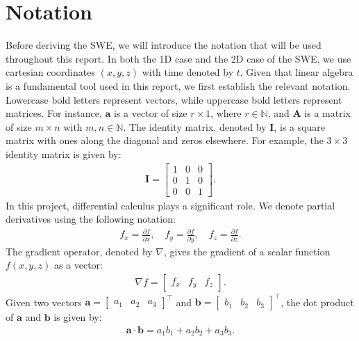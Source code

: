 \section{Notation}\label{sec:notation}
Before deriving the SWE, we will introduce the notation that will be used throughout this report.
In both the 1D case and the 2D case of the SWE, we use cartesian coordinates $(x, y, z)$ with time denoted by $t$.
Given that linear algebra is a fundamental tool used in this report, we first establish the relevant notation.
Lowercase bold letters represent vectors, while uppercase bold letters represent matrices.
For instance, $\mathbf{a}$ is a vector of size $r \times 1$, where $r \in \mathbb{N}$, and $\mathbf{A}$ is a matrix of size $m \times n$ with $m,n \in \mathbb{N}$.
The identity matrix, denoted by $\mathbf{I}$, is a square matrix with ones along the diagonal and zeros elsewhere.
For example, the $3 \times 3$ identity matrix is given by:
\begin{align*}
    \mathbf{I} = \begin{bmatrix}
        1 & 0 & 0 \\
        0 & 1 & 0 \\
        0 & 0 & 1
    \end{bmatrix}.
\end{align*}
In this project, differential calculus plays a significant role.
We denote partial derivatives using the following notation:
\begin{align}\label{eq:notation_partial_derivatives}
   f_x =  \frac{\partial f}{\partial x}, \quad f_y = \frac{\partial f}{\partial y}, \quad f_z = \frac{\partial f}{\partial z}.
\end{align}
The gradient operator, denoted by $\nabla$, gives the gradient of a scalar function $f(x,y,z)$ as a vector:
\begin{align*}
    \nabla f = \begin{bmatrix}
        f_x &
        f_y &
        f_z
    \end{bmatrix}.
\end{align*}
Given two vectors $\mathbf{a} = \begin{bmatrix}
    a_1 & a_2 & a_3
\end{bmatrix}^\top $ and $\mathbf{b} = \begin{bmatrix}
    b_1 & b_2 & b_3
\end{bmatrix}^\top$, the dot product of $\mathbf{a}$ and $\mathbf{b}$ is given by:
\begin{align*}
    \mathbf{a} \cdot \mathbf{b} = a_1 b_1 + a_2 b_2 + a_3 b_3.
\end{align*}
